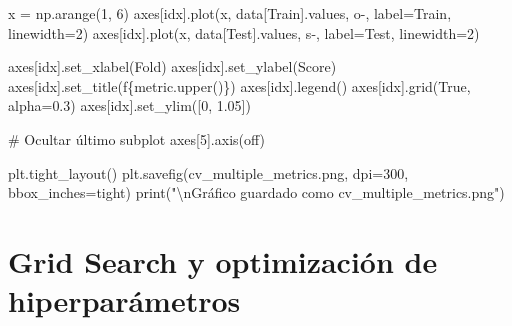 \documentclass[
  doc,
  floatsintext,
  longtable,
  a4paper,
  nolmodern,
  notxfonts,
  notimes,
  12pt,
  colorlinks=true,linkcolor=blue,citecolor=blue,urlcolor=blue]{apa7}
\newenvironment{Shaded}{\begin{snugshade}}{\end{snugshade}}
\newcommand{\BuiltInTok}[1]{\textcolor[rgb]{0.00,0.23,0.31}{#1}}
\newcommand{\CharTok}[1]{\textcolor[rgb]{0.13,0.47,0.30}{#1}}
\newcommand{\CommentTok}[1]{\textcolor[rgb]{0.37,0.37,0.37}{#1}}
\newcommand{\DecValTok}[1]{\textcolor[rgb]{0.68,0.00,0.00}{#1}}
\newcommand{\FloatTok}[1]{\textcolor[rgb]{0.68,0.00,0.00}{#1}}
\newcommand{\NormalTok}[1]{\textcolor[rgb]{0.00,0.23,0.31}{#1}}
\newcommand{\OperatorTok}[1]{\textcolor[rgb]{0.37,0.37,0.37}{#1}}
\newcommand{\SpecialCharTok}[1]{\textcolor[rgb]{0.37,0.37,0.37}{#1}}
\newcommand{\SpecialStringTok}[1]{\textcolor[rgb]{0.13,0.47,0.30}{#1}}
\newcommand{\StringTok}[1]{\textcolor[rgb]{0.13,0.47,0.30}{#1}}
\newcommand{\VariableTok}[1]{\textcolor[rgb]{0.07,0.07,0.07}{#1}}
\begin{document}
\begin{Shaded}
\begin{Highlighting}[]
\NormalTok{    x }\OperatorTok{=}\NormalTok{ np.arange(}\DecValTok{1}\NormalTok{, }\DecValTok{6}\NormalTok{)}
\NormalTok{    axes[idx].plot(x, data[}\StringTok{\textquotesingle{}Train\textquotesingle{}}\NormalTok{].values, }\StringTok{\textquotesingle{}o{-}\textquotesingle{}}\NormalTok{, label}\OperatorTok{=}\StringTok{\textquotesingle{}Train\textquotesingle{}}\NormalTok{, linewidth}\OperatorTok{=}\DecValTok{2}\NormalTok{)}
\NormalTok{    axes[idx].plot(x, data[}\StringTok{\textquotesingle{}Test\textquotesingle{}}\NormalTok{].values, }\StringTok{\textquotesingle{}s{-}\textquotesingle{}}\NormalTok{, label}\OperatorTok{=}\StringTok{\textquotesingle{}Test\textquotesingle{}}\NormalTok{, linewidth}\OperatorTok{=}\DecValTok{2}\NormalTok{)}
    
\NormalTok{    axes[idx].set\_xlabel(}\StringTok{\textquotesingle{}Fold\textquotesingle{}}\NormalTok{)}
\NormalTok{    axes[idx].set\_ylabel(}\StringTok{\textquotesingle{}Score\textquotesingle{}}\NormalTok{)}
\NormalTok{    axes[idx].set\_title(}\SpecialStringTok{f\textquotesingle{}}\SpecialCharTok{\{}\NormalTok{metric}\SpecialCharTok{.}\NormalTok{upper()}\SpecialCharTok{\}}\SpecialStringTok{\textquotesingle{}}\NormalTok{)}
\NormalTok{    axes[idx].legend()}
\NormalTok{    axes[idx].grid(}\VariableTok{True}\NormalTok{, alpha}\OperatorTok{=}\FloatTok{0.3}\NormalTok{)}
\NormalTok{    axes[idx].set\_ylim([}\DecValTok{0}\NormalTok{, }\FloatTok{1.05}\NormalTok{])}

\CommentTok{\# Ocultar último subplot}
\NormalTok{axes[}\DecValTok{5}\NormalTok{].axis(}\StringTok{\textquotesingle{}off\textquotesingle{}}\NormalTok{)}

\NormalTok{plt.tight\_layout()}
\NormalTok{plt.savefig(}\StringTok{\textquotesingle{}cv\_multiple\_metrics.png\textquotesingle{}}\NormalTok{, dpi}\OperatorTok{=}\DecValTok{300}\NormalTok{, bbox\_inches}\OperatorTok{=}\StringTok{\textquotesingle{}tight\textquotesingle{}}\NormalTok{)}
\BuiltInTok{print}\NormalTok{(}\StringTok{"}\CharTok{\textbackslash{}n}\StringTok{Gráfico guardado como \textquotesingle{}cv\_multiple\_metrics.png\textquotesingle{}"}\NormalTok{)}
\end{Highlighting}
\end{Shaded}

\section{Grid Search y optimización de
hiperparámetros}\label{grid-search-y-optimizaciuxf3n-de-hiperparuxe1metros}
\end{document}
